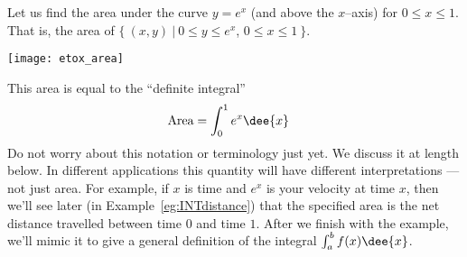 Let us find the area under the curve $y=e^x$ (and above the $x$--axis)
for $0\le x\le 1$. That is, the area of
$\big\{\ (x,y)\ \big|\ 0\le y\le e^x$, $0\le x\le 1\ \big\}$.
\begin{efig}
 \begin{center}
  \texttt{[image: etox\_area]}
 \end{center}
\end{efig}
This area is equal to the
``definite integral''
\begin{align*}
  \text{Area} &= \int_0^1 e^x \dee{x}
\end{align*}
Do not worry about this notation or terminology just yet. We discuss
it at length below. In different applications this quantity will
have different interpretations --- not just area. For example, if $x$
is time and $e^x$ is your velocity at time $x$, then we'll see later
(in Example~\ref{eg:INTdistance}) that the specified area is the
net distance travelled between time $0$ and time $1$. After we finish
with the example, we'll mimic it to give a general definition of the
integral $\int_a^b f(x) \dee{x}$.


